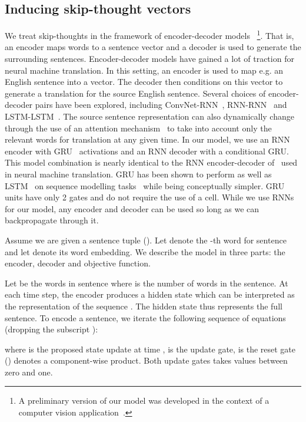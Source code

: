 \documentclass{article} \usepackage{nips15submit_e,times}
\begin{document}
\subsection{Inducing skip-thought vectors}

We treat skip-thoughts in the framework of encoder-decoder models ~\footnote{A preliminary version of
our model was developed in the context of a computer vision application~\cite{moviebook15}.}. That is, an encoder maps words to a sentence vector and a decoder is used to generate the surrounding sentences. Encoder-decoder models have gained a lot of traction for neural machine translation. In this setting, an encoder is used to map e.g. an English sentence into a vector. The decoder then conditions on this vector to generate a translation for the source English sentence. Several choices of encoder-decoder pairs have been explored, including ConvNet-RNN~\cite{kalchbrenner2013recurrent}, RNN-RNN~\cite{cho2014learning} and LSTM-LSTM~\cite{sutskever2014sequence}. The source sentence representation can also dynamically change through the use of an attention mechanism~\cite{bahdanau2014neural} to take into account only the relevant words for translation at any given time. In our model, we use an RNN encoder with GRU~\cite{chung2014empirical} activations and an RNN decoder with a conditional GRU. This model combination is nearly identical to the RNN encoder-decoder of~\cite{cho2014learning} used in neural machine translation. GRU has been shown to perform as well as LSTM~\cite{hochreiter1997long} on sequence modelling tasks~\cite{chung2014empirical} while being conceptually simpler. GRU units have only 2 gates and do not require the use of a cell. While we use RNNs for our model, any encoder and decoder can be used so long as we can backpropagate through it.

Assume we are given a sentence tuple (). Let  denote the -th word for sentence  and let  denote its word embedding. We describe the model in three parts: the encoder, decoder and objective function.

 Let  be the words in sentence  where  is the number of words in the sentence. At each time step, the encoder produces a hidden state  which can be interpreted as the representation of the sequence . The hidden state   thus represents the full sentence. To encode a sentence, we iterate the following sequence of equations (dropping the subscript ):

where  is the proposed state update at time ,  is the update gate,  is the reset gate () denotes a component-wise product. Both update gates takes values between zero and one.
\end{document}
